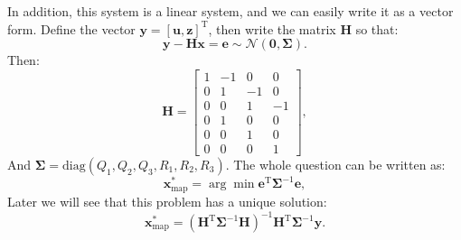 In addition, this system is a linear system, and we can easily write it as a vector form. Define the vector $\bm{y}=[\bm{u}, \bm{z}]^\mathrm{T}$, then write the matrix $\bm{H}$ so that:
\begin{equation}
\bm{y}-\bm{H}\bm{x} = \bm{e} \sim \mathcal{N}(\bm{0}, \boldsymbol{\Sigma}).
\end{equation}
Then:
\begin{equation}
\bm{H} = \left[ {\begin{array}{*{20}{c}}
1&{ - 1}&0&0\\
0&1&{ - 1}&0\\
0&0&1&{ - 1}\\
\hline
0&1&0&0\\
0&0&1&0\\
0&0&0&1
\end{array}} \right],
\end{equation}
And $\boldsymbol{\Sigma}=\mathrm{diag}(Q_1, Q_2, Q_3, R_1, R_2, R_3)$. The whole question can be written as:
\begin{equation}
\bm{x}^*_{\mathrm{map}} = \arg \min \bm{e}^\mathrm{T} \boldsymbol{\Sigma}^{-1} \bm{e},
\end{equation}
Later we will see that this problem has a unique solution:
\begin{equation}
\bm{x}^*_{\mathrm{map}} = (\bm{H}^\mathrm{T} \boldsymbol{\Sigma}^{-1} \bm{H})^{-1} \bm{H}^\mathrm{T} \boldsymbol{\Sigma}^{-1} \bm{y}.
\end{equation}

